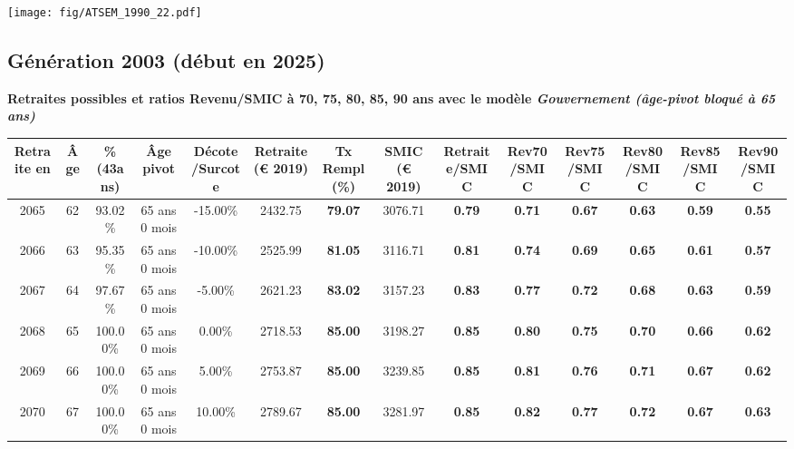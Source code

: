  \vspace{0.1cm} 

 \begin{center}\texttt{[image: fig/ATSEM\_1990\_22.pdf]}\end{center} \label{fig/ATSEM_1990_22.pdf} 

\newpage 
 
\subsection{Génération 2003 (début en 2025)} 

{\bf \noindent Retraites possibles et ratios Revenu/SMIC à 70, 75, 80, 85, 90 ans avec le modèle \emph{Gouvernement (âge-pivot bloqué à 65 ans)}}  
 
\begin{adjustbox}{max width=\textwidth} 
\begin{tabular}[htb]{|c|c||c|c|c||c|c||c||c|c|c|c|c|c|} 
\hline 
 Retraite en &  Âge &  \%(43ans) &  Âge pivot &  Décote/Surcote &  Retraite (\euro{} 2019) &  Tx Rempl(\%) &  SMIC (\euro{} 2019) &  Retraite/SMIC &  Rev70/SMIC &  Rev75/SMIC &  Rev80/SMIC &  Rev85/SMIC &  Rev90/SMIC \\ 
\hline \hline 
 2065 &  62 &  93.02\% &  65 ans 0 mois &  -15.00\% &  2432.75 &  {\bf 79.07} &  3076.71 &  {\bf {\color{red} 0.79}} &  {\bf {\color{red} 0.71}} &  {\bf {\color{red} 0.67}} &  {\bf {\color{red} 0.63}} &  {\bf {\color{red} 0.59}} &  {\bf {\color{red} 0.55}} \\ 
\hline 
 2066 &  63 &  95.35\% &  65 ans 0 mois &  -10.00\% &  2525.99 &  {\bf 81.05} &  3116.71 &  {\bf {\color{red} 0.81}} &  {\bf {\color{red} 0.74}} &  {\bf {\color{red} 0.69}} &  {\bf {\color{red} 0.65}} &  {\bf {\color{red} 0.61}} &  {\bf {\color{red} 0.57}} \\ 
\hline 
 2067 &  64 &  97.67\% &  65 ans 0 mois &  -5.00\% &  2621.23 &  {\bf 83.02} &  3157.23 &  {\bf {\color{red} 0.83}} &  {\bf {\color{red} 0.77}} &  {\bf {\color{red} 0.72}} &  {\bf {\color{red} 0.68}} &  {\bf {\color{red} 0.63}} &  {\bf {\color{red} 0.59}} \\ 
\hline 
 2068 &  65 &  100.00\% &  65 ans 0 mois &  0.00\% &  2718.53 &  {\bf 85.00} &  3198.27 &  {\bf {\color{red} 0.85}} &  {\bf {\color{red} 0.80}} &  {\bf {\color{red} 0.75}} &  {\bf {\color{red} 0.70}} &  {\bf {\color{red} 0.66}} &  {\bf {\color{red} 0.62}} \\ 
\hline 
 2069 &  66 &  100.00\% &  65 ans 0 mois &  5.00\% &  2753.87 &  {\bf 85.00} &  3239.85 &  {\bf {\color{red} 0.85}} &  {\bf {\color{red} 0.81}} &  {\bf {\color{red} 0.76}} &  {\bf {\color{red} 0.71}} &  {\bf {\color{red} 0.67}} &  {\bf {\color{red} 0.62}} \\ 
\hline 
 2070 &  67 &  100.00\% &  65 ans 0 mois &  10.00\% &  2789.67 &  {\bf 85.00} &  3281.97 &  {\bf {\color{red} 0.85}} &  {\bf {\color{red} 0.82}} &  {\bf {\color{red} 0.77}} &  {\bf {\color{red} 0.72}} &  {\bf {\color{red} 0.67}} &  {\bf {\color{red} 0.63}} \\ 
\hline 
\hline 
\end{tabular} 
\end{adjustbox} 
 
